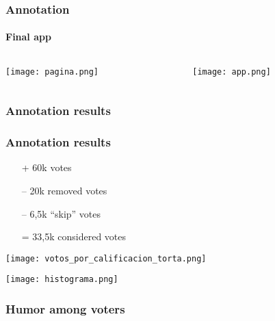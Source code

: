 \begin{frame}
\frametitle{Annotation}
\framesubtitle{Final app}
    \begin{center}
        \begin{columns}[c]
            \begin{column}[c]{0.45\textwidth}
                \centering
                \texttt{[image: pagina.png]}
            \end{column}

            \begin{column}[c]{0.45\textwidth}
                \centering
                \texttt{[image: app.png]}
            \end{column}
        \end{columns}
    \end{center}
\end{frame}

\subsubsection{Annotation results}
\begin{frame}[allowframebreaks]
    \frametitle{Annotation results}

    \begin{itemize}
        \item[+] 60k votes
        \item[--] 20k removed votes
        \item[--] 6,5k ``skip'' votes
        \item[=] 33,5k considered votes
    \end{itemize}

    \framebreak{}

    \begin{center}
        \texttt{[image: votos\_por\_calificacion\_torta.png]}

        \texttt{[image: histograma.png]}
    \end{center}
\end{frame}

\subsubsection{Humor among voters}

